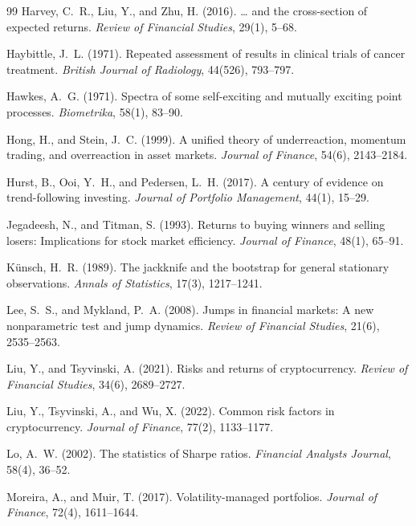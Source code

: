 \documentclass[11pt,a4paper]{article}
\newcommand{\1}{\mathbf{1}}
\begin{document}
\begin{thebibliography}{99}
 Harvey, C.~R., Liu, Y., and Zhu, H. (2016). \ldots{} and the cross-section of expected returns. \emph{Review of Financial Studies}, 29(1), 5--68.

 Haybittle, J.~L. (1971). Repeated assessment of results in clinical trials of cancer treatment. \emph{British Journal of Radiology}, 44(526), 793--797.

 Hawkes, A.~G. (1971). Spectra of some self-exciting and mutually exciting point processes. \emph{Biometrika}, 58(1), 83--90.

 Hong, H., and Stein, J.~C. (1999). A unified theory of underreaction, momentum trading, and overreaction in asset markets. \emph{Journal of Finance}, 54(6), 2143--2184.

 Hurst, B., Ooi, Y.~H., and Pedersen, L.~H. (2017). A century of evidence on trend-following investing. \emph{Journal of Portfolio Management}, 44(1), 15--29.

 Jegadeesh, N., and Titman, S. (1993). Returns to buying winners and selling losers: Implications for stock market efficiency. \emph{Journal of Finance}, 48(1), 65--91.

 K\"unsch, H.~R. (1989). The jackknife and the bootstrap for general stationary observations. \emph{Annals of Statistics}, 17(3), 1217--1241.

 Lee, S.~S., and Mykland, P.~A. (2008). Jumps in financial markets: A new nonparametric test and jump dynamics. \emph{Review of Financial Studies}, 21(6), 2535--2563.

 Liu, Y., and Tsyvinski, A. (2021). Risks and returns of cryptocurrency. \emph{Review of Financial Studies}, 34(6), 2689--2727.

 Liu, Y., Tsyvinski, A., and Wu, X. (2022). Common risk factors in cryptocurrency. \emph{Journal of Finance}, 77(2), 1133--1177.

 Lo, A.~W. (2002). The statistics of Sharpe ratios. \emph{Financial Analysts Journal}, 58(4), 36--52.

 Moreira, A., and Muir, T. (2017). Volatility-managed portfolios. \emph{Journal of Finance}, 72(4), 1611--1644.


\end{thebibliography}
\end{document}

